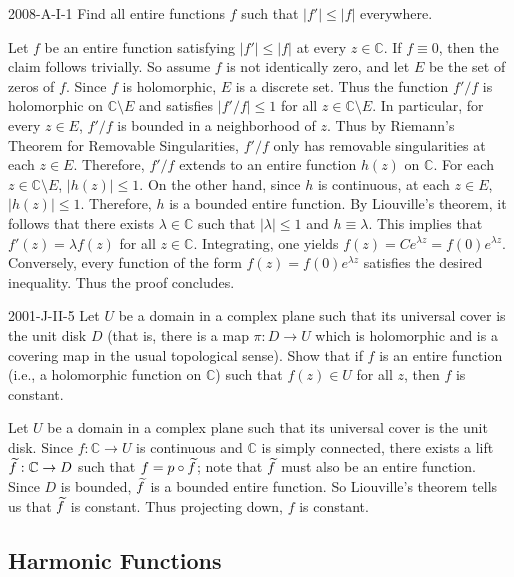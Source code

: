 \documentclass{article}
\begin{document}
	\begin{prb}{2008-A-I-1}
		Find all entire functions $f$ such that $|f'| \leq |f|$ everywhere. 
	\end{prb}
	Let $f$ be an entire function satisfying $|f'| \leq |f|$ at every $z \in \mathbb{C}$. If $f \equiv 0$, then the claim follows trivially. So assume $f$ is not identically zero, and let $E$ be the set of zeros of $f$. Since $f$ is holomorphic, $E$ is a discrete set. Thus the function $f'/f$ is holomorphic on $\mathbb{C}\setminus E$ and satisfies $|f'/f| \leq 1$ for all $z \in \mathbb{C}\setminus E$. In particular, for every $z \in E$, $f'/f$ is bounded in a neighborhood of $z$. Thus by Riemann's Theorem for Removable Singularities, $f'/f$ only has removable singularities at each $z \in E$. Therefore, $f'/f$ extends to an entire function $h(z)$ on $\mathbb{C}$. For each $z \in \mathbb{C}\setminus E$, $|h(z)| \leq 1$. On the other hand, since $h$ is continuous, at each $z \in E$, $|h(z)| \leq 1$. Therefore, $h$ is a bounded entire function. By Liouville's theorem, it follows that there exists $\lambda \in \mathbb{C}$ such that $|\lambda| \leq 1$ and $h \equiv \lambda$. This implies that $f'(z) = \lambda f(z)$ for all $z \in \mathbb{C}$. Integrating, one yields $f(z) = Ce^{\lambda z} = f(0)e^{\lambda z}$. Conversely, every function of the form $f(z) = f(0)e^{\lambda z}$ satisfies the desired inequality. Thus the proof concludes.
	
	\begin{prb}{2001-J-II-5}
		Let $U$ be a domain in a complex plane such that its universal cover is the unit disk $D$ (that is, there is a map $\pi: D \to U$ which is holomorphic and is a covering map in the usual topological sense). Show that if $f$ is an entire function (i.e., a holomorphic function on $\mathbb{C}$) such that $f(z) \in U$ for all $z$, then $f$ is constant. 
	\end{prb}
	Let $U$ be a domain in a complex plane such that its universal cover is the unit disk. Since $f: \mathbb{C} \to U$ is continuous and $\mathbb{C}$ is simply connected, there exists a lift $\widetilde{f}: \mathbb{C} \to D$ such that $f = p \circ \widetilde{f}$; note that $\widetilde{f}$ must also be an entire function. Since $D$ is bounded, $\widetilde{f}$ is a bounded entire function. So Liouville's theorem tells us that $\widetilde{f}$ is constant. Thus projecting down, $f$ is constant. 
	
	\subsection{Harmonic Functions}
	
\end{document}
